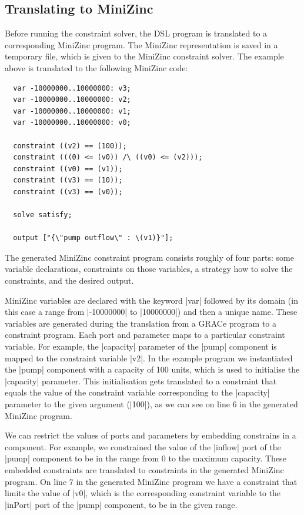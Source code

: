 \documentclass{article}
\begin{document}
\subsection{Translating to MiniZinc}

Before running the constraint solver, the DSL program is translated to
a corresponding MiniZinc program.
%
The MiniZinc representation is saved in a temporary file, which is
given to the MiniZinc constraint solver.
%
The example above is translated to the following MiniZinc code:
%
\begin{verbatim}
  var -10000000..10000000: v3;
  var -10000000..10000000: v2;
  var -10000000..10000000: v1;
  var -10000000..10000000: v0;

  constraint ((v2) == (100));
  constraint (((0) <= (v0)) /\ ((v0) <= (v2)));
  constraint ((v0) == (v1));
  constraint ((v3) == (10));
  constraint ((v3) == (v0));

  solve satisfy;

  output ["{\"pump outflow\" : \(v1)}"];
\end{verbatim}
%
The generated MiniZinc constraint program consists roughly of four
parts: some variable declarations, constraints on those variables, a
strategy how to solve the constraints, and the desired output.

MiniZinc variables are declared with the keyword |var| followed by its
domain (in this case a range from |-10000000| to |10000000|) and then
a unique name.
%
These variables are generated during the translation from a GRACe
program to a constraint program.
%
Each port and parameter maps to a particular constraint variable.
%
For example, the |capacity| parameter of the |pump| component is
mapped to the constraint variable |v2|.
%
In the example program we instantiated the |pump| component with a
capacity of 100 units, which is used to initialise the |capacity|
parameter.
%
This initialisation gets translated to a constraint that equals the
value of the constraint variable corresponding to the |capacity|
parameter to the given argument (|100|), as we can see on line 6 in
the generated MiniZinc program.

We can restrict the values of ports and parameters by embedding
constrains in a component.
%
For example, we constrained the value of the |inflow| port of the
|pump| component to be in the range from 0 to the maximum capacity.
%
These embedded constraints are translated to constraints in the
generated MiniZinc program.
%
On line 7 in the generated MiniZinc program we have a constraint that
limits the value of |v0|, which is the corresponding constraint
variable to the |inPort| port of the |pump| component, to be in the
given range.
\end{document}
